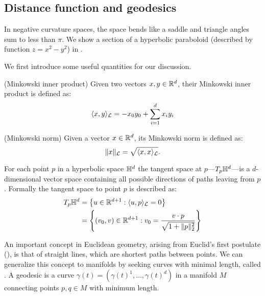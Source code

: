 \subsection{Distance function and geodesics}
In negative curvature spaces, the space bends like a saddle and triangle angles sum to less than $\pi$. We show a section of a hyperbolic paraboloid (described by function $z=x^2-y^2$) in .



We first introduce some useful quantities for our discussion.

\begin{definition}(Minkowski inner product) \label{def:minkowskiInnerProduct}
    Given two vectors $x,y \in \mathbb{R}^d$, their Minkowski inner product is defined as:
    \begin{equation*}
        \langle x, y \rangle_{\mathcal{L}} = -x_0y_0+\sum_{i=1}^d x_iy_i
    \end{equation*}    
\end{definition}

\begin{definition}(Minkowski norm) \label{def:minkowskiNorm}
    Given a vector $x \in \mathbb{R}^d$, its Minkowski norm is defined as:
    \begin{equation*}
        \|x\|_{\mathcal{L}} = \sqrt{\langle x, x \rangle_{\mathcal{L}}}.
    \end{equation*}
\end{definition}

For each point $p$ in a hyperbolic space $\mathbb{H}^d$ the tangent space at $p$---$T_p\mathbb{H}^d$---is a $d$-dimensional vector space containing all possible directions of paths leaving from $p$. Formally the tangent space to point $p$ is described as:
\begin{align*}
    T_p\mathbb{H}^d 
    &= \left\{u\in \mathbb{R}^{d+1} : \langle u, p \rangle_{\mathcal{L}} = 0\right\} \\
    &= \left\{(v_0,v) \in \mathbb{R}^{d+1} : v_0 = \frac{v \cdot p}{\sqrt{1 + \|p\|^2_2}}\right\}
\end{align*}

An important concept in Euclidean geometry, arising from Euclid's first postulate (), is that of straight lines, which are shortest paths between points. We can generalize this concept to manifolds by seeking curves with minimal length, called . A geodesic is a curve $\gamma(t)=(\gamma(t)^1, \dots, \gamma(t)^d)$ in a manifold $M$ connecting points $p,q\in M$ with minimum length. 


